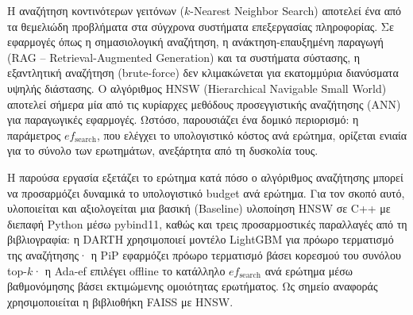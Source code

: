 \documentclass[12pt,a4paper]{article}
\begin{document}
Η αναζήτηση κοντινότερων γειτόνων ($k$-Nearest Neighbor Search) αποτελεί ένα από τα θεμελιώδη προβλήματα στα σύγχρονα συστήματα επεξεργασίας πληροφορίας. Σε εφαρμογές όπως η σημασιολογική αναζήτηση, η ανάκτηση-επαυξημένη παραγωγή (RAG -- Retrieval-Augmented Generation) και τα συστήματα σύστασης, η εξαντλητική αναζήτηση (brute-force) δεν κλιμακώνεται για εκατομμύρια διανύσματα υψηλής διάστασης. Ο αλγόριθμος HNSW (Hierarchical Navigable Small World) αποτελεί σήμερα μία από τις κυρίαρχες μεθόδους προσεγγιστικής αναζήτησης (ANN) για παραγωγικές εφαρμογές. Ωστόσο, παρουσιάζει ένα δομικό περιορισμό: η παράμετρος $ef_{\text{search}}$, που ελέγχει το υπολογιστικό κόστος ανά ερώτημα, ορίζεται ενιαία για το σύνολο των ερωτημάτων, ανεξάρτητα από τη δυσκολία τους.

Η παρούσα εργασία εξετάζει το ερώτημα κατά πόσο ο αλγόριθμος αναζήτησης μπορεί να προσαρμόζει δυναμικά το υπολογιστικό budget ανά ερώτημα. Για τον σκοπό αυτό, υλοποιείται και αξιολογείται μια βασική (Baseline) υλοποίηση HNSW σε C++ με διεπαφή Python μέσω pybind11, καθώς και τρεις προσαρμοστικές παραλλαγές από τη βιβλιογραφία: η DARTH χρησιμοποιεί μοντέλο LightGBM για πρόωρο τερματισμό της αναζήτησης· η PiP εφαρμόζει πρόωρο τερματισμό βάσει κορεσμού του συνόλου top-$k$· η Ada-ef επιλέγει offline το κατάλληλο $ef_{\text{search}}$ ανά ερώτημα μέσω βαθμονόμησης βάσει εκτιμώμενης ομοιότητας ερωτήματος. Ως σημείο αναφοράς χρησιμοποιείται η βιβλιοθήκη FAISS με HNSW.
\end{document}

